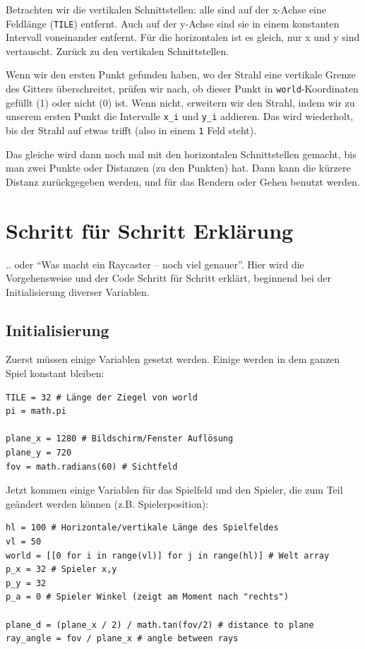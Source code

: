 \documentclass[a4paper,12pt]{report}
\begin{document}
Betrachten wir die vertikalen Schnittstellen: alle sind auf der x-Achse eine Feldl\"ange (\texttt{TILE}) entfernt. Auch auf der y-Achse sind sie in einem konstanten Intervall voneinander entfernt. F\"ur die horizontalen ist es gleich, nur x und y sind vertauscht. Zur\"uck zu den vertikalen Schnittstellen.

Wenn wir den ersten Punkt gefunden haben, wo der Strahl eine vertikale Grenze des Gitters \"uberschreitet, pr\"ufen wir nach, ob dieser Punkt in \texttt{world}-Koordinaten gef\"ullt (1) oder nicht (0) ist. Wenn nicht, erweitern wir den Strahl, indem wir zu unserem ersten Punkt die Intervalle \texttt{x\_i} und \texttt{y\_i} addieren. Das wird wiederholt, bis der Strahl auf etwas trifft (also in einem \texttt{1} Feld steht).

Das gleiche wird dann noch mal mit den horizontalen Schnittstellen gemacht, bis man zwei Punkte oder Distanzen (zu den Punkten) hat. Dann kann die k\"urzere Distanz zur\"uckgegeben werden, und f\"ur das Rendern oder Gehen benutzt werden.

\section{Schritt f\"ur Schritt Erkl\"arung}

.. oder ``Was macht ein Raycaster -- noch viel genauer''. Hier wird die Vorgehensweise und der Code Schritt f\"ur Schritt erkl\"art, beginnend bei der Initialisierung diverser Variablen.

\subsection{Initialisierung}

Zuerst m\"ussen einige Variablen gesetzt werden. Einige werden in dem ganzen Spiel konstant bleiben:
\begin{Verbatim}[baselinestretch=1.0, xleftmargin=1cm]
TILE = 32 # Länge der Ziegel von world
pi = math.pi

plane_x = 1280 # Bildschirm/Fenster Auflösung
plane_y = 720
fov = math.radians(60) # Sichtfeld
\end{Verbatim}

Jetzt kommen einige Variablen f\"ur das Spielfeld und den Spieler, die zum Teil ge\"andert werden k\"onnen (z.B. Spielerposition):
\begin{Verbatim}[baselinestretch=1.0, xleftmargin=1cm]
hl = 100 # Horizontale/vertikale Länge des Spielfeldes
vl = 50
world = [[0 for i in range(vl)] for j in range(hl)] # Welt array
p_x = 32 # Spieler x,y
p_y = 32
p_a = 0 # Spieler Winkel (zeigt am Moment nach "rechts")

plane_d = (plane_x / 2) / math.tan(fov/2) # distance to plane
ray_angle = fov / plane_x # angle between rays
\end{Verbatim}
\end{document}
